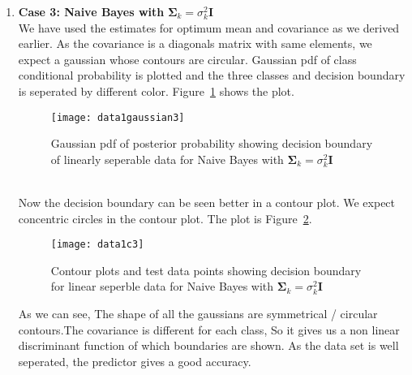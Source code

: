 \documentclass[11pt,paper=a4,answers]{exam}
\begin{document}
\begin{questions}
\begin{enumerate}[i.]
\begin{enumerate}
            \item \textbf{Case 3: Naive Bayes with} $\bm{\Sigma}_k = \sigma_k^2\bm{I}$\\
            We have used the estimates for optimum mean and covariance as we derived earlier. As the covariance is a diagonals matrix with same elements, we expect a gaussian whose contours are circular. Gaussian pdf of class conditional probability is plotted and the three classes and decision boundary is seperated by different color. Figure~\ref{fig:data1g3} shows the plot.
            \begin{figure}[ht]
                \centering
                \texttt{[image: data1gaussian3]}
                \vspace{-30pt}
                \caption{Gaussian pdf of posterior probability showing decision boundary of linearly seperable data for Naive Bayes with $\bm{\Sigma}_k = \sigma_k^2\bm{I}$}
                \label{fig:data1g3}
            \end{figure}\\
            Now the decision boundary can be seen better in a contour plot. We expect concentric circles in the contour plot. The plot is Figure~\ref{fig:data1c3}.\\ 
            \begin{figure}[ht]
                \centering
                \texttt{[image: data1c3]}
                \vspace{-30pt}
                \caption{Contour plots and test data points showing decision boundary for linear seperble data for Naive Bayes with $\bm{\Sigma}_k = \sigma_k^2\bm{I}$}
                \label{fig:data1c3}
            \end{figure}
            As we can see, The shape of all the gaussians are symmetrical / circular contours.The covariance is different for each class, So it gives us a non linear discriminant function of which boundaries are shown. As the data set is well seperated, the predictor gives a good accuracy.\\


\end{enumerate}
\end{enumerate}
\end{questions}
\end{document}
